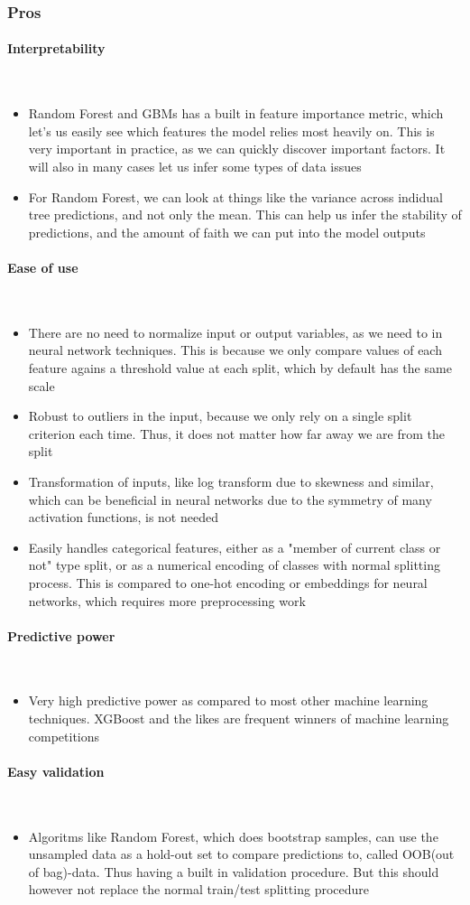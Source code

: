 \documentclass[10pt, a4paper, twocolumn]{article}
\newcommand{\myparagraph}[1]{\paragraph{#1}\mbox{}\\}
\begin{document}
	\subsubsection{Pros}
	\myparagraph{Interpretability}
	\begin{itemize}
		\item Random Forest and GBMs has a built in feature importance metric, which let's us easily see which features the model relies most heavily on. This is very important in practice, as we can quickly discover important factors. It will also in many cases let us infer some types of data issues
		\item For Random Forest, we can look at things like the variance across indidual tree predictions, and not only the mean. This can help us infer the stability of predictions, and the amount of faith we can put into the model outputs
	\end{itemize}
	\myparagraph{Ease of use}
	\begin{itemize}
		\item There are no need to normalize input or output variables, as we need to in neural network techniques. This is because we only compare values of each feature agains a threshold value at each split, which by default has the same scale
		\item Robust to outliers in the input, because we only rely on a single split criterion each time. Thus, it does not matter how far away we are from the split
		\item Transformation of inputs, like log transform due to skewness and similar, which can be beneficial in neural networks due to the symmetry of many activation functions, is not needed
		\item Easily handles categorical features, either as a "member of current class or not" type split, or as a numerical encoding of classes with normal splitting process. This is compared to one-hot encoding or embeddings for neural networks, which requires more preprocessing work
	\end{itemize}
	\myparagraph{Predictive power}
	\begin{itemize}
		\item Very high predictive power as compared to most other machine learning techniques. XGBoost and the likes are frequent winners of machine learning competitions
	\end{itemize}
	\myparagraph{Easy validation}
	\begin{itemize}
		\item Algoritms like Random Forest, which does bootstrap samples, can use the unsampled data as a hold-out set to compare predictions to, called OOB(out of bag)-data. Thus having a built in validation procedure. But this should however not replace the normal train/test splitting procedure
	\end{itemize}
\end{document}
